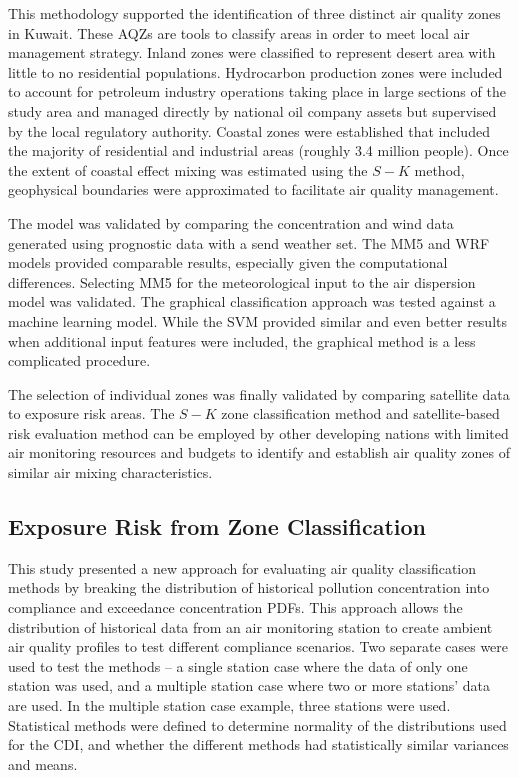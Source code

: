 This methodology supported the identification of three distinct air quality zones in Kuwait.  These AQZs are tools to classify areas in order to meet local air management strategy.  Inland zones were classified to represent  desert area with little to no residential populations.  Hydrocarbon production zones were included to account for petroleum industry operations taking place in large sections of the study area and managed directly by national oil company assets but supervised by the local regulatory authority.  Coastal zones were established that included the majority of residential and industrial areas (roughly 3.4 million people).  Once the extent of coastal effect mixing was estimated using the $S-K$ method, geophysical boundaries were approximated to facilitate air quality management. 

The model was validated by comparing the concentration and wind data generated using prognostic data with a send weather set. The MM5 and WRF models provided comparable results, especially given the computational differences. Selecting MM5 for the meteorological input to the air dispersion model was validated. The graphical classification approach was tested against a machine learning model. While the SVM provided similar and even better results when additional input features were included, the graphical method is a less complicated procedure.

The selection of individual zones was finally validated by comparing satellite data to exposure risk areas.  The $S-K$ zone classification method and satellite-based risk evaluation method can be employed by other developing nations with limited air monitoring resources and budgets to identify and establish air quality zones of similar air mixing characteristics.

\subsection{Exposure Risk from Zone Classification}

This study presented a new approach for evaluating air quality classification methods by breaking the distribution of historical pollution concentration into compliance and exceedance concentration PDFs. This approach allows the distribution of historical data from an air monitoring station to create ambient air quality profiles to test different compliance scenarios. Two separate cases were used to test the methods – a single station case where the data of only one station was used, and a multiple station case where two or more stations’ data are used. In the multiple station case example, three stations were used. Statistical methods were defined to determine normality of the distributions used for the CDI, and whether the different methods had statistically similar variances and means.

